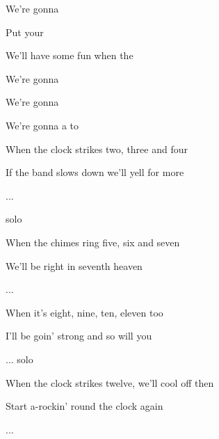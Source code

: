 

\zs 
{}



We're gonna 
\ks

\zs

Put your 

We'll have some fun when the 

We're gonna 

We're gonna 

We're gonna  a to
\ks

\zs
When the clock strikes two, three and four

If the band slows down we'll yell for more

...
\ks

\zs
solo
\ks

\zs
When the chimes ring five, six and seven

We'll be right in seventh heaven

...
\ks

\zs
When it's eight, nine, ten, eleven too

I'll be goin' strong and so will you

...
\ks
\zs
solo
\ks

\zs
When the clock strikes twelve, we'll cool off then

Start a-rockin' round the clock again

...
\ks

\kp

